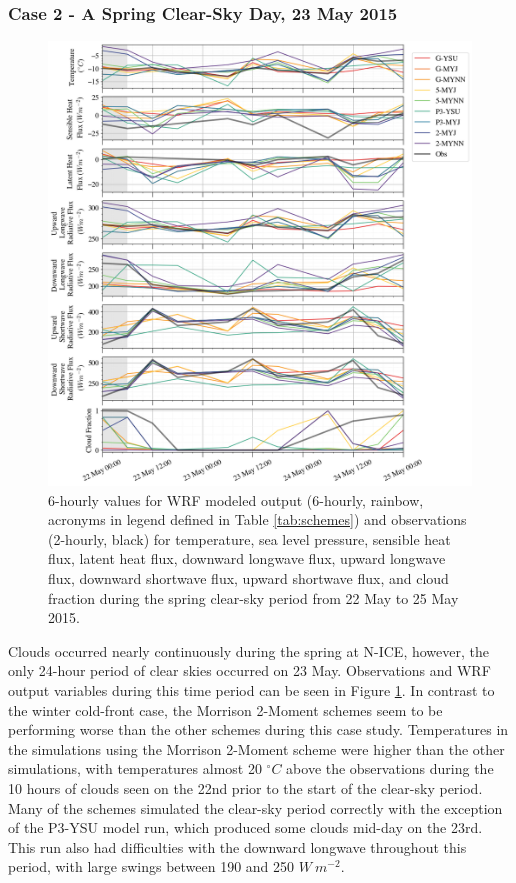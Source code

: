 \subsubsection{Case 2 - A Spring Clear-Sky Day, 23 May 2015}
\begin{figure}[p!]
    \centering \hspace*{-0.75cm}
    \includegraphics[width=1.1\linewidth]{figures/chapter3/wrf_case2.png}
    \caption[Polar WRF Case 3 - Spring clear-sky (23 May 2015) time series]{6-hourly values for WRF modeled output (6-hourly, rainbow, acronyms in legend defined in Table \ref{tab:schemes}) and observations (2-hourly, black) for temperature, sea level pressure, sensible heat flux, latent heat flux, downward longwave flux, upward longwave flux, downward shortwave flux, upward shortwave flux, and cloud fraction during the spring clear-sky period from 22 May to 25 May 2015.}
    \label{fig:wrf_case2}
\end{figure}

Clouds occurred nearly continuously during the spring at N-ICE, however, the only 24-hour period of clear skies occurred on 23 May. Observations and WRF output variables during this time period can be seen in Figure \ref{fig:wrf_case2}. In contrast to the winter cold-front case, the Morrison 2-Moment schemes seem to be performing worse than the other schemes during this case study. Temperatures in the simulations using the Morrison 2-Moment scheme were higher than the other simulations, with temperatures almost 20 $^{\circ} C$ above the observations during the 10 hours of clouds seen on the 22nd prior to the start of the clear-sky period. Many of the schemes simulated the clear-sky period correctly with the exception of the P3-YSU model run, which produced some clouds mid-day on the 23rd. This run also had difficulties with the downward longwave throughout this period, with large swings between 190 and 250 $W~m^{-2}$. 

